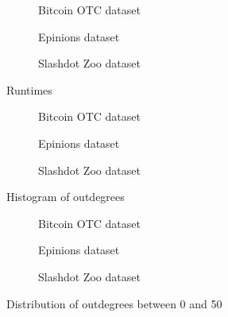 \begin{figure}[t]
    \centering
        \begin{subfigure}[t]{0.30\textwidth}
        \caption{Bitcoin OTC dataset}
    \end{subfigure}
    \hfill
        \begin{subfigure}[t]{0.30\textwidth}
        \caption{Epinions dataset}
    \end{subfigure}
    \hfill
    \begin{subfigure}[t]{0.30\textwidth}
    	\centering
    	\caption{Slashdot Zoo dataset}
    \end{subfigure}
    \caption{Runtimes}
    \label{fig:datasets_runtimes}
\end{figure}

\begin{figure}[t]
    \centering
        \begin{subfigure}[t]{0.30\textwidth}
        \caption{Bitcoin OTC dataset}
        \label{subfig:bitcoinotc_outdegrees}
    \end{subfigure}
    \hfill
        \begin{subfigure}[t]{0.30\textwidth}
        \caption{Epinions dataset}
        \label{subfig:epinions_outdegrees}
    \end{subfigure}
    \hfill
    \begin{subfigure}[t]{0.30\textwidth}
    	\centering
    	\caption{Slashdot Zoo dataset}
	\label{subfig:slashdot_outdegrees}
    \end{subfigure}
    \caption{Histogram of outdegrees}
    \label{fig:datasets_outdegree_distr}
\end{figure}

\begin{figure}[t]
    \centering
        \begin{subfigure}[t]{0.30\textwidth}
        \caption{Bitcoin OTC dataset}
        \label{subfig:bitcoinotc_outdegrees}
    \end{subfigure}
    \hfill
        \begin{subfigure}[t]{0.30\textwidth}
        \caption{Epinions dataset}
        \label{subfig:epinions_outdegrees}
    \end{subfigure}
    \hfill
    \begin{subfigure}[t]{0.30\textwidth}
    	\centering
    	\caption{Slashdot Zoo dataset}
	\label{subfig:slashdot_outdegrees}
    \end{subfigure}
    \caption{Distribution of outdegrees between 0 and 50}
    \label{fig:datasets_outdegree_distr_50}
\end{figure}

